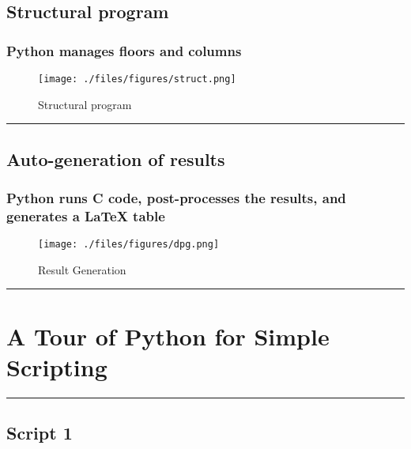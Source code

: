 \documentclass{article}
\begin{document}
\subsection{Structural program}\label{structural-program}

\subsubsection{Python manages floors and
columns}\label{python-manages-floors-and-columns}

\begin{figure}[htbp]
\centering
\texttt{[image: ./files/figures/struct.png]}
\caption{Structural program}
\end{figure}

    \begin{center}\rule{3in}{0.4pt}\end{center}

\subsection{Auto-generation of
results}\label{auto-generation-of-results}

\subsubsection{Python runs C code, post-processes the results, and
generates a LaTeX
table}\label{python-runs-c-code-post-processes-the-results-and-generates-a-latex-table}

\begin{figure}[htbp]
\centering
\texttt{[image: ./files/figures/dpg.png]}
\caption{Result Generation}
\end{figure}

    \begin{center}\rule{3in}{0.4pt}\end{center}

\section{A Tour of Python for Simple
Scripting}\label{a-tour-of-python-for-simple-scripting}

    \begin{center}\rule{3in}{0.4pt}\end{center}

\subsection{Script 1}\label{script-1}
\end{document}
